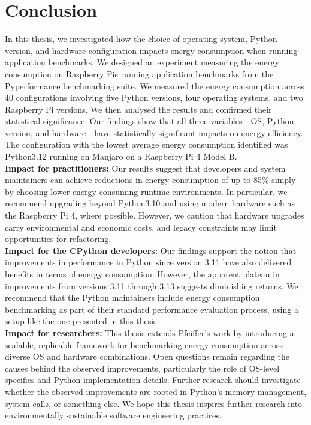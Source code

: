 \section{Conclusion}
\label{sec:conclusion}
In this thesis, we investigated how the choice of operating system, Python version, and hardware configuration impacts energy consumption when running application benchmarks. We designed an experiment measuring the energy consumption on Raspberry Pis running application benchmarks from the Pyperformance benchmarking suite. We measured the energy consumption across 40 configurations involving five Python versions, four operating systems, and two Raspberry Pi versions. We then analysed the results and confirmed their statistical significance. Our findings show that all three variables—OS, Python version, and hardware—have statistically significant impacts on energy efficiency. The configuration with the lowest average energy consumption identified was Python3.12 running on Manjaro on a Raspberry Pi 4 Model B.\\
\textbf{Impact for practitioners:} Our results suggest that developers and system maintainers can achieve reductions in energy consumption of up to 85\% simply by choosing lower energy-consuming runtime environments. In particular, we recommend upgrading beyond Python3.10 and using modern hardware such as the Raspberry Pi 4, where possible. However, we caution that hardware upgrades carry environmental and economic costs, and legacy constraints may limit opportunities for refactoring.\\
\textbf{Impact for the CPython developers:} Our findings support the notion that improvements in performance in Python since version 3.11 have also delivered benefits in terms of energy consumption. However, the apparent plateau in improvements from versions 3.11 through 3.13 suggests diminishing returns. We recommend that the Python maintainers include energy consumption benchmarking as part of their standard performance evaluation process, using a setup like the one presented in this thesis.\\
\textbf{Impact for researchers:} This thesis extends Pfeiffer’s work by introducing a scalable, replicable framework for benchmarking energy consumption across diverse OS and hardware combinations. Open questions remain regarding the causes behind the observed improvements, particularly the role of OS-level specifics and Python implementation details. Further research should investigate whether the observed improvements are rooted in Python’s memory management, system calls, or something else. We hope this thesis inspires further research into environmentally sustainable software engineering practices.
